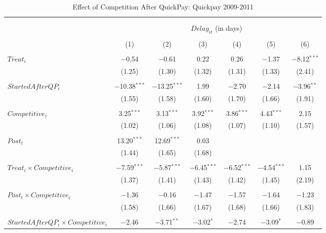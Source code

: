 \documentclass[
]{article}
\begin{document}
\begin{table}[H] \centering 
  \caption{Effect of Competition After QuickPay: Quickpay 2009-2011} 
  \label{} 
\small 
\begin{tabular}{@{\extracolsep{-3pt}}lcccccc} 
\\[-1.8ex]\hline 
\hline \\[-1.8ex] 
\\[-1.8ex] & \multicolumn{6}{c}{$Delay_{it}$ (in days)} \\ 
\\[-1.8ex] & (1) & (2) & (3) & (4) & (5) & (6)\\ 
\hline \\[-1.8ex] 
 $Treat_i$ & $-$0.54 & $-$0.61 & 0.22 & 0.26 & $-$1.37 & $-$8.12$^{***}$ \\ 
  & (1.25) & (1.30) & (1.32) & (1.31) & (1.33) & (2.41) \\ 
  & & & & & & \\ 
 $StartedAfterQP_i$ & $-$10.38$^{***}$ & $-$13.25$^{***}$ & 1.99 & $-$2.70 & $-$2.14 & $-$3.96$^{**}$ \\ 
  & (1.55) & (1.58) & (1.60) & (1.70) & (1.66) & (1.91) \\ 
  & & & & & & \\ 
 $Competitive_i$ & 3.25$^{***}$ & 3.13$^{***}$ & 3.92$^{***}$ & 3.86$^{***}$ & 4.43$^{***}$ & 2.15 \\ 
  & (1.02) & (1.06) & (1.08) & (1.07) & (1.10) & (1.57) \\ 
  & & & & & & \\ 
 $Post_t$ & 13.20$^{***}$ & 12.69$^{***}$ & 0.03 &  &  &  \\ 
  & (1.44) & (1.65) & (1.68) &  &  &  \\ 
  & & & & & & \\ 
 $Treat_i \times Competitive_i$ & $-$7.59$^{***}$ & $-$5.87$^{***}$ & $-$6.45$^{***}$ & $-$6.52$^{***}$ & $-$4.54$^{***}$ & 1.15 \\ 
  & (1.37) & (1.41) & (1.43) & (1.42) & (1.45) & (2.19) \\ 
  & & & & & & \\ 
 $Post_t \times Competitive_i$ & $-$1.36 & $-$0.16 & $-$1.47 & $-$1.57 & $-$1.64 & $-$1.23 \\ 
  & (1.58) & (1.66) & (1.67) & (1.68) & (1.66) & (1.83) \\ 
  & & & & & & \\ 
 $StartedAfterQP_i \times Competitive_i$ & $-$2.46 & $-$3.71$^{**}$ & $-$3.02$^{*}$ & $-$2.74 & $-$3.09$^{*}$ & $-$0.89 \\ 

\end{tabular}
\end{table}
\end{document}
